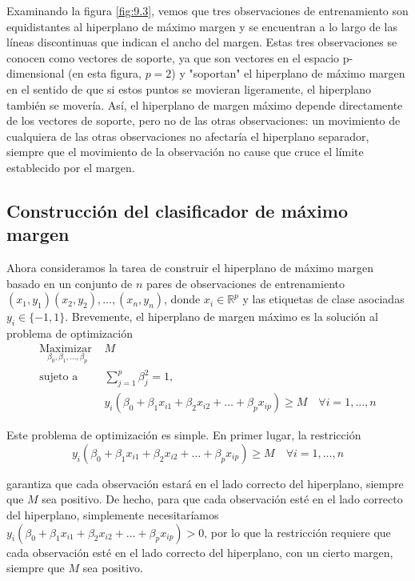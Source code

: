 Examinando la figura \ref{fig:9.3}, vemos que tres observaciones de entrenamiento son equidistantes al hiperplano de máximo margen y se encuentran a lo largo de las líneas discontinuas que indican el ancho del margen. Estas tres observaciones se conocen como vectores de soporte, ya que son vectores en el espacio p-dimensional (en esta figura, $p = 2$) y "soportan" el hiperplano de máximo margen en el sentido de que si estos puntos se movieran ligeramente, el hiperplano también se movería. Así, el hiperplano de margen máximo depende directamente de los vectores de soporte, pero no de las otras observaciones: un movimiento de cualquiera de las otras observaciones no afectaría el hiperplano separador, siempre que el movimiento de la observación no cause que cruce el límite establecido por el margen. \\

\subsection{Construcción del clasificador de máximo margen}

Ahora consideramos la tarea de construir el hiperplano de máximo margen basado en un conjunto de $n$ pares de observaciones de entrenamiento $(x_1, y_1) (x_2, y_2), \ldots, (x_n, y_n)$, donde $x_i \in \mathbb{R}^p$ y las etiquetas de clase asociadas $y_i \in \{-1, 1\}$. Brevemente, el hiperplano de margen máximo es la solución al problema de optimización
\begin{align}
\underset{\beta_0, \beta_1, \ldots, \beta_p}{\text{Maximizar }} & M \label{eq:9.9}\\
\text{sujeto a } & \sum_{j = 1}^{p} \beta_j^2 = 1, \label{eq:9.10}\\
& y_i (\beta_0 + \beta_1 x_{i1} + \beta_2 x_{i2} + \ldots + \beta_p x_{ip}) \geq M \quad \forall i = 1, \ldots, n \label{eq:9.11}
\end{align}

\noindent Este problema de optimización es simple. En primer lugar, la restricción 
\begin{equation}
y_i (\beta_0 + \beta_1 x_{i1} + \beta_2 x_{i2} + \ldots + \beta_p x_{ip}) \geq M \quad \forall i = 1, \ldots, n
\end{equation}

\noindent garantiza que cada observación estará en el lado correcto del hiperplano, siempre que $M$ sea positivo. De hecho, para que cada observación esté en el lado correcto del hiperplano, simplemente necesitaríamos $y_i (\beta_0 + \beta_1 x_{i1} + \beta_2 x_{i2} + \ldots + \beta_p x_{ip}) > 0$, por lo que la restricción requiere que cada observación esté en el lado correcto del hiperplano, con un cierto margen, siempre que $M$ sea positivo. \\

